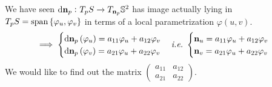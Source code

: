 We have seen \(\dd{\vb{n}}_p\colon T_p S\to T_{\vb{n}_p}\mathbb{S}^2\)
has image actually lying in \(T_p S=\operatorname{span}\left\{\varphi_u,
\varphi_v\right\}\) in terms of a local parametrization \(\varphi(u,v)\).
\[
    \implies \begin{cases}
        \dd\vb{n}_p\left(\varphi_u\right)=a_{11}\varphi_u+a_{12}\varphi_v\\
        \dd\vb{n}_p\left(\varphi_v\right)=a_{21}\varphi_u+a_{22}\varphi_v
    \end{cases}
    \emph{i.e.}\ \begin{cases}
        \vb{n}_u=a_{11}\varphi_u+a_{12}\varphi_v\\
        \vb{n}_v=a_{21}\varphi_u+a_{22}\varphi_v
    \end{cases}
\]
We would like to find out the matrix \(\begin{pmatrix}
    a_{11}&a_{12}\\
    a_{21}&a_{22}
\end{pmatrix}\).

